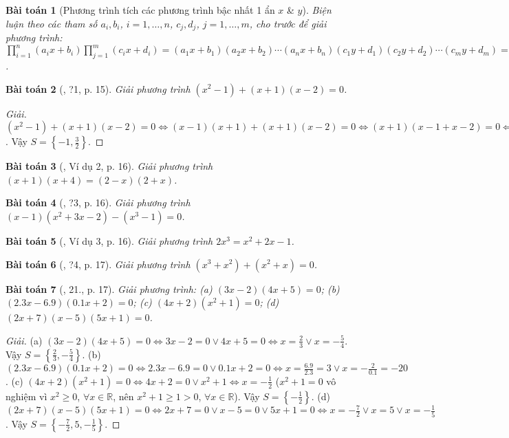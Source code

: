 \documentclass{article}
\newtheorem{baitoan}{Bài toán}
\begin{document}
\begin{baitoan}[Phương trình tích các phương trình bậc nhất 1 ẩn $x$ \& $y$]
	Biện luận theo các tham số $a_i,b_i$, $i = 1,\ldots,n$, $c_j,d_j$, $j = 1,\ldots,m$, cho trước để giải phương trình: $\prod_{i=1}^n (a_ix + b_i)\prod_{j=1}^m (c_ix + d_i) = (a_1x + b_1)(a_2x + b_2)\cdots(a_nx + b_n)(c_1y + d_1)(c_2y + d_2)\cdots(c_my + d_m) = 0$.
\end{baitoan}

\begin{baitoan}[\cite{SGK_Toan_8_tap_2}, ?1, p. 15]
	Giải phương trình $(x^2 - 1) + (x + 1)(x - 2) = 0$.
\end{baitoan}

\begin{proof}[Giải]
	$(x^2 - 1) + (x + 1)(x - 2) = 0\Leftrightarrow(x - 1)(x + 1) + (x + 1)(x - 2) = 0\Leftrightarrow(x + 1)(x - 1 + x - 2) = 0\Leftrightarrow(x + 1)(2x - 3) = 0\Leftrightarrow x = -1\lor x = \frac{3}{2}$. Vậy $S = \left\{-1,\frac{3}{2}\right\}$.
\end{proof}

\begin{baitoan}[\cite{SGK_Toan_8_tap_2}, Ví dụ 2, p. 16]
	Giải phương trình $(x + 1)(x + 4) = (2 - x)(2 + x)$.
\end{baitoan}

\begin{baitoan}[\cite{SGK_Toan_8_tap_2}, ?3, p. 16]
	Giải phương trình $(x - 1)(x^2 + 3x - 2) - (x^3 - 1) = 0$.
\end{baitoan}

\begin{baitoan}[\cite{SGK_Toan_8_tap_2}, Ví dụ 3, p. 16]
	Giải phương trình $2x^3 = x^2 + 2x - 1$.
\end{baitoan}

\begin{baitoan}[\cite{SGK_Toan_8_tap_2}, ?4, p. 17]
	Giải phương trình $(x^3 + x^2) + (x^2 + x) = 0$.
\end{baitoan}

\begin{baitoan}[\cite{SGK_Toan_8_tap_2}, 21., p. 17]
	Giải phương trình: (a) $(3x - 2)(4x + 5) = 0$; (b) $(2.3x - 6.9)(0.1x + 2) = 0$; (c) $(4x + 2)(x^2 + 1) = 0$; (d) $(2x + 7)(x - 5)(5x + 1) = 0$.
\end{baitoan}

\begin{proof}[Giải]
	(a) $(3x - 2)(4x + 5) = 0\Leftrightarrow3x - 2 = 0\lor4x + 5 = 0\Leftrightarrow x = \frac{2}{3}\lor x = -\frac{5}{4}$. Vậy $S = \left\{\frac{2}{3},-\frac{5}{4}\right\}$. (b) $(2.3x - 6.9)(0.1x + 2) = 0\Leftrightarrow 2.3x - 6.9 = 0\lor0.1x + 2 = 0\Leftrightarrow x = \frac{6.9}{2.3} = 3\lor x = -\frac{2}{0.1} = -20$. (c) $(4x + 2)(x^2 + 1) = 0\Leftrightarrow4x + 2 = 0\lor x^2 + 1\Leftrightarrow x = -\frac{1}{2}$ ($x^2 + 1 = 0$ vô nghiệm vì $x^2\ge0$, $\forall x\in\mathbb{R}$, nên $x^2 + 1\ge1 > 0$, $\forall x\in\mathbb{R}$). Vậy $S = \left\{-\frac{1}{2}\right\}$. (d) $(2x + 7)(x - 5)(5x + 1) = 0\Leftrightarrow2x + 7 = 0\lor x - 5 = 0\lor5x + 1 = 0\Leftrightarrow x = -\frac{7}{2}\lor x = 5\lor x = -\frac{1}{5}$. Vậy $S = \left\{-\frac{7}{2},5,-\frac{1}{5}\right\}$.
\end{proof}
\end{document}
